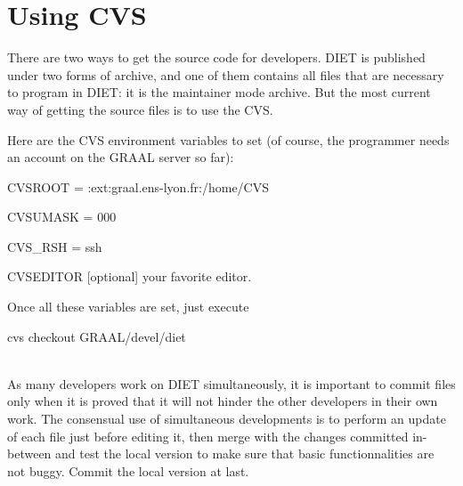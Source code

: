 

\section{Using CVS}

There are two ways to get the source code for developers. DIET is published
under two forms of archive, and one of them contains all files that are
necessary to program in DIET: it is the maintainer mode archive. But the most
current way of getting the source files is to use the CVS.

Here are the CVS environment variables to set (of course, the programmer needs
an account on the GRAAL server so far):
\begin{description}
\item{\sf CVSROOT} \textsf{ = :ext:graal.ens-lyon.fr:/home/CVS}
\item{\sf CVSUMASK} \textsf{ = 000}
\item{\sf CVS\_RSH} \textsf{ = ssh}
\item{\sf CVSEDITOR [optional]} your favorite editor.
\end{description}

Once all these variables are set, just execute\\
\centerline{\sf cvs checkout GRAAL/devel/diet}\\


As many developers work on DIET simultaneously, it is important to commit files
only when it is proved that it will not hinder the other developers in their own
work. The consensual use of simultaneous developments is to perform an update of
each file just before editing it, then merge with the changes committed
in-between and test the local version to make sure that basic functionnalities
are not buggy. Commit the local version at last.

